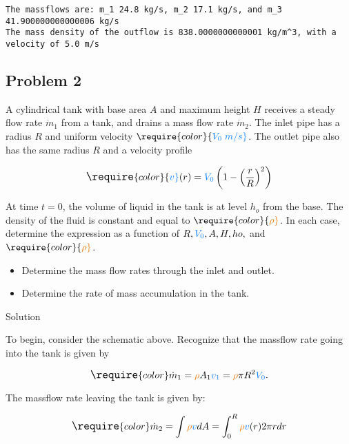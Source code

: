 \documentclass[
  1.2em,
  letterpaper,
  DIV=11,
  numbers=noendperiod]{scrartcl}
\begin{document}
\begin{verbatim}
The massflows are: m_1 24.8 kg/s, m_2 17.1 kg/s, and m_3 41.900000000000006 kg/s
The mass density of the outflow is 838.0000000000001 kg/m^3, with a velocity of 5.0 m/s
\end{verbatim}

\hypertarget{problem-2}{%
\subsection{Problem 2}\label{problem-2}}

A cylindrical tank with base area \(A\) and maximum height \(H\)
receives a steady flow rate \(\dot{m}_1\) from a tank, and drains a mass
flow rate \(\dot{m}_2\). The inlet pipe has a radius \(R\) and uniform
velocity
\(\require{color}{\color[rgb]{0.059472,0.501943,0.998465}V_0 \; m/s}\).
The outlet pipe also has the same radius \(R\) and a velocity profile

\[
\large
\require{color}{\color[rgb]{0.059472,0.501943,0.998465}v}(r)={\color[rgb]{0.059472,0.501943,0.998465}V_0 } \left( 1- \left( \frac{r}{R} \right)^2 \right)
\]

At time \(t = 0\), the volume of liquid in the tank is at level \(h_o\)
from the base. The density of the fluid is constant and equal to
\(\require{color}{\color[rgb]{0.918231,0.469102,0.038229}\rho}\). In
each case, determine the expression as a function of
\(R, {\color[rgb]{0.059472,0.501943,0.998465}V_0 }, A, H, ho,\) and
\(\require{color}{\color[rgb]{0.918231,0.469102,0.038229}\rho}\).

\begin{itemize}
\item
  Determine the mass flow rates through the inlet and outlet.
\item
  Determine the rate of mass accumulation in the tank.
\end{itemize}

Solution

To begin, consider the schematic above. Recognize that the massflow rate
going into the tank is given by

\[
\large
\require{color}\dot{m}_1 = {\color[rgb]{0.918231,0.469102,0.038229}\rho}A_1 {\color[rgb]{0.059472,0.501943,0.998465}v_1} = {\color[rgb]{0.918231,0.469102,0.038229}\rho} \pi R^2 {\color[rgb]{0.059472,0.501943,0.998465}V_0 }.
\]

The massflow rate leaving the tank is given by:

\[
\large
\require{color}\dot{m}_2 = \int {\color[rgb]{0.918231,0.469102,0.038229}\rho} {\color[rgb]{0.059472,0.501943,0.998465}v} dA = \int_{0}^{R} {\color[rgb]{0.918231,0.469102,0.038229}\rho} {\color[rgb]{0.059472,0.501943,0.998465}v}(r) 2 \pi r dr
\]
\end{document}

